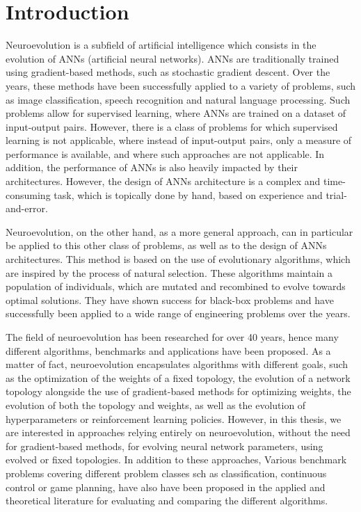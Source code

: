 \chapter{Introduction}

Neuroevolution is a subfield of artificial intelligence which consists in the evolution of ANNs (artificial neural networks).
ANNs are traditionally trained using gradient-based methods, such as stochastic gradient descent.
Over the years, these methods have been successfully applied to a variety of problems, such as image classification, speech recognition and natural language processing.
Such problems allow for supervised learning, where ANNs are trained on a dataset of input-output pairs.
However, there is a class of problems for which supervised learning is not applicable, where instead of input-output pairs, only a measure of performance is available, and
where such approaches are not applicable.
In addition, the performance of ANNs is also heavily impacted by their architectures. However, the design of ANNs architecture is a complex and time-consuming task, which is
topically done by hand, based on experience and trial-and-error.

Neuroevolution, on the other hand, as a more general approach, can in particular be applied to this other class of problems, as well as to the design of ANNs architectures.
This method is based on the use of evolutionary algorithms, which are inspired by the process of natural selection. These algorithms maintain a population of individuals,
which are mutated and recombined to evolve towards optimal solutions. They have shown success for black-box problems and have successfully been applied to a wide range
of engineering problems over the years.

The field of neuroevolution has been researched for over 40 years, hence many different algorithms, benchmarks and applications have been proposed.
As a matter of fact, neuroevolution encapsulates algorithms with different goals, such as the optimization of the weights of a fixed topology, the evolution of a
network topology alongside the use of gradient-based methods for optimizing weights, the evolution of both the topology and weights, as well as the evolution
of hyperparameters or reinforcement learning policies.
However, in this thesis, we are interested in approaches relying entirely on neuroevolution, without the need for gradient-based methods, for evolving neural network
parameters, using evolved or fixed topologies. In addition to these approaches, Various benchmark problems covering different problem classes sch as classification,
continuous control or game planning, have also have been proposed in the applied and theoretical literature for evaluating and comparing the different algorithms.

